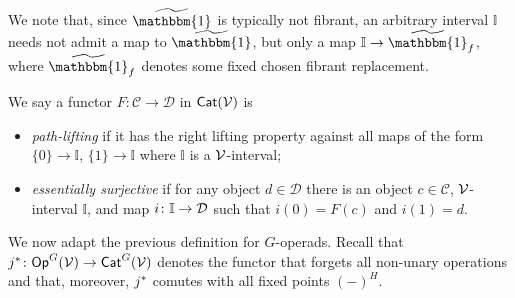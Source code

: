 \documentclass[a4paper,10pt
,draft
]{article}%
\newcommand{\I}{\mathbb I}
\newcommand{\J}{\mathbb J}
\renewcommand{\1}{\eta}%
\begin{document}
\begin{remark}
	We note that, since $\widetilde{\mathbbm{1}}$ is typically not fibrant,
	an arbitrary interval $\mathbb{I}$
	needs not admit a map to $\widetilde{\mathbbm{1}}$,
	but only a map $\mathbb{I} \to \widetilde{\mathbbm{1}}_f$,
	where $\widetilde{\mathbbm{1}}_f$ denotes some fixed chosen fibrant replacement.
\end{remark}




\begin{definition}\label{PL_ES_DEFN}
We say a functor $F: \mathcal C \to \mathcal D$ in $\mathsf{Cat}(\mathcal V)$ is
\begin{itemize}
\item \textit{path-lifting}
	if it has the right lifting property against all maps of the form
	$\{0\} \to \I$, $\{1\} \to \I$
	where $\I$ is a $\mathcal V$-interval; 
\item \textit{essentially surjective} 
	if for any object $d \in \mathcal{D}$
	there is an object $c \in \mathcal{C}$,
	$\mathcal V$-interval $\mathbb{I}$,
	and map $i \colon \mathbb{I} \to \mathcal{D}$
	such that $i(0) = F(c)$ and $i(1)=d$.
      \end{itemize}
\end{definition}


We now adapt the previous definition for $G$-operads.
Recall that $j^{\**} \colon \mathsf{Op}^G(\V) \to \mathsf{Cat}^G(\V)$
denotes the functor that forgets all non-unary operations and that, moreover, 
$j^{\**}$ comutes with all fixed points $(-)^H$.
\end{document}
